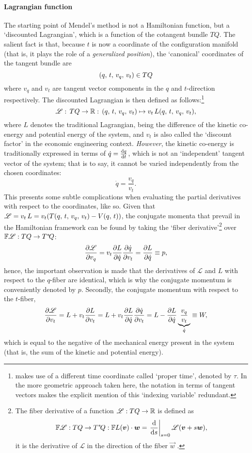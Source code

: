 \paragraph{Lagrangian function} The starting point of Mendel's method is not a Hamiltonian function, but a `discounted Lagrangian', which is a function of the cotangent bundle $TQ$. The salient fact is that, because $t$ is now a coordinate of the configuration manifold (that is, it plays the role of a \emph{generalized position}), the `canonical' coordinates of the tangent bundle are
$$ \qty(q,\,t,\,v_q,\,v_t) \in TQ$$
where $v_q$ and $v_t$ are tangent vector components in the $q$ and $t$-direction respectively. The discounted Lagrangian is then defined as follows:\footnote{\citet{Mendel2021} makes use of a different time coordinate called `proper time', denoted by $\tau$. In the more geometric approach taken here, the notation in terms of tangent vectors makes the explicit mention of this `indexing variable' redundant.}
$$ \mathscr{L}:\,TQ\to\mathbb{R}:\,\qty(q,\,t,\,v_q,\,v_t) \mapsto v_t\,L(q,\,t,\,v_q,\,v_t), $$
where $L$ denotes the traditional Lagrangian, being the difference of the kinetic co-energy and potential energy of the system, and $v_t$ is also called the `discount factor' in the economic engineering context. \emph{However}, the kinetic co-energy is traditionally expressed in terms of $\dot{q} = \dv{q}{t}$, which is not an `independent' tangent vector of the system; that is to say, it cannot be varied independently from the chosen coordinates:
$$ \dot{q} = \frac{v_q}{v_t}. $$
This presents some subtle complications when evaluating the partial derivatives with respect to the coordinates, like so. Given that $\mathscr{L} = v_t\,L = v_t\qty(T(q,\,t,\,v_q,\,v_t) - V(q,\,t))$, the conjugate momenta that prevail in the Hamiltonian framework can be found by taking the `fiber derivative'\footnote{The fiber derivative of a function $\mathscr{L}: TQ \to \mathbb{R}$ is defined as $$ \mathbb{F}\mathscr{L}: TQ \to \cotangent{Q}: \mathbb{F}\lag(\vec{v})\cdot\vec{w} = \left.\dv{}{s}\right|_{s = 0} \mathscr{L}(\vec{v} + s\vec{w}), $$ it is the derivative of $\mathscr{L}$ in the direction of the fiber $\vec{w}$ \cite[p. 179]{Marsden1998}.} over $\mathbb{F}\mathscr{L}: TQ \to T^*\!Q$: \cite{Abraham1978}
$$ \pdv{\mathscr{L}}{v_q} = v_t\pdv{L}{\dot{q}}\pdv{\dot{q}}{v_t} = \pdv{L}{\dot{q}}  \equiv p,$$
hence, the important observation is made that the derivatives of $\mathscr{L}$ and $L$ with respect to the $q$-fiber are identical, which is why the conjugate momentum is conveniently denoted by $p$. Secondly, the conjugate momentum with respect to the $t$-fiber,
$$ \pdv{\mathscr{L}}{v_t} = L + v_t\pdv{L}{v_t} = L + v_t\pdv{L}{\dot{q}}\pdv{\dot{q}}{v_t} = L - \pdv{L}{\dot{q}}\underbrace{\frac{v_q}{v_t}}_{\dot{q}} \equiv W, $$
which is equal to the negative of the mechanical energy present in the system (that is, the sum of the kinetic and potential energy). 

